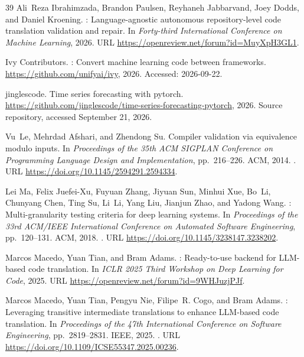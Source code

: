 \documentclass{article}
\begin{document}
\begin{thebibliography}{39}
Ali~Reza Ibrahimzada, Brandon Paulsen, Reyhaneh Jabbarvand, Joey Dodds, and
  Daniel Kroening.
: Language-agnostic autonomous repository-level code
  translation validation and repair.
\newblock In \emph{Forty-third International Conference on Machine Learning},
  2026.
\newblock URL \url{https://openreview.net/forum?id=MuyXpH3GL1}.

{Ivy Contributors}.
: Convert machine learning code between frameworks.
\newblock \url{https://github.com/unifyai/ivy}, 2026.
\newblock Accessed: 2026-09-22.

{jinglescode}.
\newblock Time series forecasting with pytorch.
\newblock \url{https://github.com/jinglescode/time-series-forecasting-pytorch},
  2026.
\newblock Source repository, accessed September 21, 2026.

Vu~Le, Mehrdad Afshari, and Zhendong Su.
\newblock Compiler validation via equivalence modulo inputs.
\newblock In \emph{Proceedings of the 35th ACM SIGPLAN Conference on
  Programming Language Design and Implementation}, pp.\  216--226. ACM, 2014.
\newblock {}.
\newblock URL \url{https://doi.org/10.1145/2594291.2594334}.

Lei Ma, Felix Juefei-Xu, Fuyuan Zhang, Jiyuan Sun, Minhui Xue, Bo~Li, Chunyang
  Chen, Ting Su, Li~Li, Yang Liu, Jianjun Zhao, and Yadong Wang.
: Multi-granularity testing criteria for deep learning
  systems.
\newblock In \emph{Proceedings of the 33rd ACM/IEEE International Conference on
  Automated Software Engineering}, pp.\  120--131. ACM, 2018.
\newblock {}.
\newblock URL \url{https://doi.org/10.1145/3238147.3238202}.

Marcos Macedo, Yuan Tian, and Bram Adams.
: Ready-to-use backend for {LLM}-based code
  translation.
\newblock In \emph{ICLR 2025 Third Workshop on Deep Learning for Code},
  2025{}.
\newblock URL \url{https://openreview.net/forum?id=9WHJuzjPJf}.

Marcos Macedo, Yuan Tian, Pengyu Nie, Filipe~R. Cogo, and Bram Adams.
: Leveraging transitive intermediate translations to
  enhance {LLM}-based code translation.
\newblock In \emph{Proceedings of the 47th International Conference on Software
  Engineering}, pp.\  2819--2831. IEEE, 2025{}.
\newblock {}.
\newblock URL \url{https://doi.org/10.1109/ICSE55347.2025.00236}.


\end{thebibliography}
\end{document}
